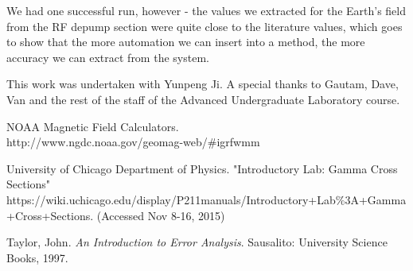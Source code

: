 \documentclass{article}
\begin{document}
  \hspace{.25cm}

  We had one successful run, however - the values we extracted for the Earth's field from the RF depump section were quite close to the literature values, which goes to show that the more automation we can insert into a method, the more accuracy we can extract from the system.

  \hspace{.25cm}

  This work was undertaken with Yunpeng Ji.  A special thanks to Gautam, Dave, Van and the rest of the staff of the Advanced Undergraduate Laboratory course.
\begin{thebibliography}{10}
    NOAA Magnetic Field Calculators. \\ http://www.ngdc.noaa.gov/geomag-web/\#igrfwmm

  	University of Chicago Department of Physics. "Introductory Lab: Gamma Cross Sections"\\
  	https://wiki.uchicago.edu/display/P211manuals/Introductory+Lab\%3A+Gamma+Cross+Sections. (Accessed Nov 8-16, 2015)

  	Taylor, John. \emph{An Introduction to Error Analysis}. Sausalito: University Science Books, 1997.
\end{thebibliography}
\end{document}
